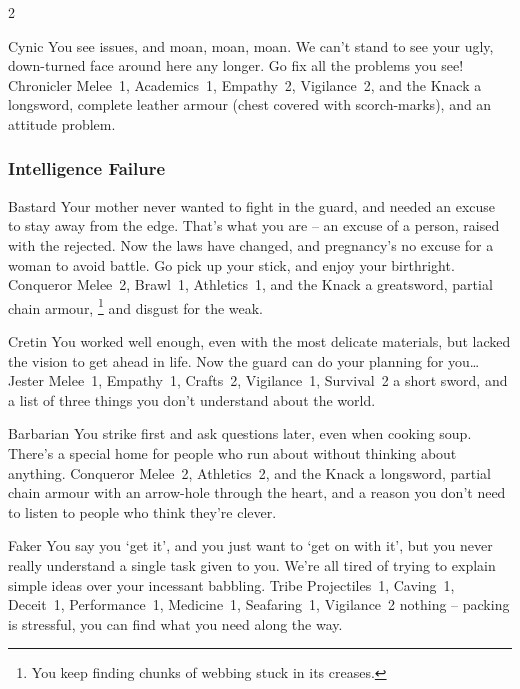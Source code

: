 \begin{multicols}{2}
\begin{itemize}
  {Cynic}%
  {You see issues, and moan, moan, moan.
  We can't stand to see your ugly, down-turned face around here any longer.
  Go fix all the problems you see!
  }%
  {Chronicler}%
  {Melee~1, Academics~1, Empathy~2, Vigilance~2, and the Knack \adrenalinesurge}%
  {a longsword, complete leather armour (chest covered with scorch-marks), and an attitude problem.}%


\end{itemize}

\needspace{10em}
\subsubsection{Intelligence Failure}

\begin{itemize}

  {Bastard}%
  {Your mother never wanted to fight in the \gls{guard}, and needed an excuse to stay away from the \gls{edge}.
  That's what you are -- an excuse of a person, raised with the rejected.
  Now the laws have changed, and pregnancy's no excuse for a woman to avoid battle.
  Go pick up your stick, and enjoy your birthright.}%
  {Conqueror}%
  {Melee~2, Brawl~1, Athletics~1, and the Knack \adrenalinesurge}%
  {a greatsword, partial chain armour,%
  \footnote{You keep finding chunks of webbing stuck in its creases.}
  and disgust for the weak.}%

  {Cretin}%
  {You worked well enough, even with the most delicate materials, but lacked the vision to get ahead in life.
  Now the \gls{guard} can do your planning for you\ldots
  }%
  {Jester}%
  {Melee~1, Empathy~1, Crafts~2, Vigilance~1, Survival~2}%
  {a short sword, and a list of three things you don't understand about the world.}%


  {Barbarian}%
  {You strike first and ask questions later, even when cooking soup.
  There's a special home for people who run about without thinking about anything.
  }%
  {Conqueror}%
  {Melee~2, Athletics~2, and the Knack \laststand}%
  {a longsword, partial chain armour with an arrow-hole through the heart, and a reason you don't need to listen to people who think they're clever.}%


  {Faker}%
  {You say you `get it', and you just want to `get on with it', but you never really understand a single task given to you.
  We're all tired of trying to explain simple ideas over your incessant babbling.
  }%
  {Tribe}%
  {Projectiles~1, Caving~1, Deceit~1, Performance~1, Medicine~1, Seafaring~1, Vigilance~2}%
  {nothing -- packing is stressful, you can find what you need along the way.}%


\end{itemize}
\end{multicols}
